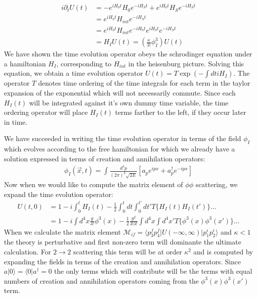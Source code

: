 \begin{align*}
i\partial_t U(t) &= -e^{iH_0t}H_0 e^{-iH_St} + e^{iH_0t} H_S e^{-iH_St}\\
&= e^{iH_0t}H_{int}e^{-iH_St}\\
&= e^{iH_0t}H_{int}e^{-iH_0t}e^{iH_0t}e^{-iH_St}\\
&= H_I U(t) = \left (\frac{\kappa}{3!}\phi_I^3 \right) U(t)
\end{align*}
We have shown the time evolution operator obeys the schrodinger equation under a hamiltonian $H_{I}$, corresponding to
 $H_{int}$ in the heisenburg picture. Solving this equation, we obtain a time evolution
operator $U(t) = T\exp (-\int dt iH_I)$. The operator $T$ denotes time ordering of the time integrals for each term
in the taylor expansion of the exponential which will not necessarily commute. Since each $H_I(t)$ will be integrated against it's own dummy time variable, the time ordering operator will place $H_I(t)$ terms farther to the left, if they occur later in time. 

We have succeeded in writing the time evolution operator in terms of the field $\phi_I$ which evolves according to the free hamiltonian for which we already have a  solution expressed in terms of creation and annihilation operators:
\begin{align*}
\phi_I(\vec x, t) = \int \frac{d^4p}{(2\pi)^3\sqrt{2E}} \left [  a_p e^{ipx} + a_p^\dagger e^{-ipx} \right ]
\end{align*}
Now when we would like to compute the matrix element of $\phi\phi$ scattering, we expand the time evolution operator:
\begin{align*}
U(t,0) &= 1 - i \int_0^t H_I(t)  - \frac{1}{2} \int_0^t dt \int_0^{t'} dt' T\{ H_I(t) H_I(t')\} \ldots \\
&= 1 - i \int d^4x \frac{g}{3!}\phi^3(x)  - \frac{1}{2} \frac{g^2}{3!3!} \int d^4x \int d^4x' T \{ \phi^3(x) \phi^3(x') \}  \ldots 
\end{align*}
When we calculate the matrix element $\mathcal{M}_{if} = \langle p_3^fp_4^f|U(-\infty,\infty)|p_1^i p_2^i \rangle$ and $\kappa<1$ the theory is perturbative and first non-zero term will dominante the ultimate calculation. 
For $2\rightarrow 2$ scattering this 
term will be at order $\kappa^2$ and is computed by expanding the fields in terms
of the creation and annihilation operators. Since $a|0\rangle = \langle 0 | a^\dagger = 0$ the only terms which will contribute will be the terms with equal numbers of creation and annihilation operators coming from the $\phi^3(x)\phi^3(x')$ term. 


